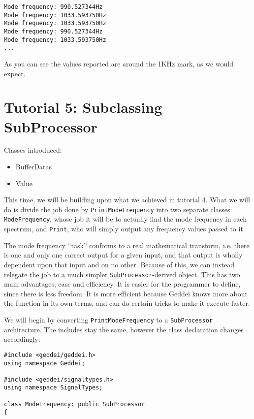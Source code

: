 \begin{verbatim}
Mode frequency: 990.527344Hz
Mode frequency: 1033.593750Hz
Mode frequency: 1033.593750Hz
Mode frequency: 990.527344Hz
Mode frequency: 1033.593750Hz
...
\end{verbatim}

As you can see the values reported are around the 1KHz mark, as we would expect.




\section{Tutorial 5: Subclassing SubProcessor}

Classes introduced:
\begin{itemize}
\item BufferDatas
\item Value
\end{itemize}

This time, we will be building upon what we achieved in tutorial 4. What we will do is divide the job done by \texttt{PrintModeFrequency} into two separate classes: \texttt{ModeFrequency}, whose job it will be to actually find the mode frequency in each spectrum, and \texttt{Print}, who will simply output any frequency values passed to it.

The mode frequency ``task'' conforms to a real mathematical transform, i.e. there is one and only one correct output for a given input, and that output is wholly dependent upon that input and on no other. Because of this, we can instead relegate the job to a much simpler \texttt{SubProcessor}-derived object. This has two main advantages; ease and efficiency. It is easier for the programmer to define, since there is less freedom. It is more efficient because Geddei knows more about the function in its own terms, and can do certain tricks to make it execute faster.

We will begin by converting \texttt{PrintModeFrequency} to a \texttt{SubProcessor} architecture. The includes stay the same, however the class declaration changes accordingly:

\begin{verbatim}
#include <geddei/geddei.h>
using namespace Geddei;

#include <geddei/signaltypes.h>
using namespace SignalTypes;

class ModeFrequency: public SubProcessor
{
\end{verbatim}

